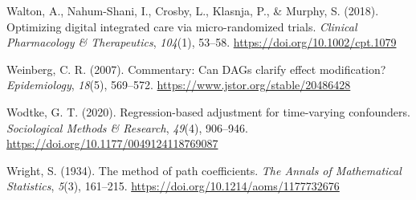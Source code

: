 \documentclass[
  11pt,
  a4paper,
]{article}
\newlength{\cslhangindent}
\newenvironment{CSLReferences}[2] %
 {\begin{list}{}{%
  \setlength{\itemindent}{0pt}
  \setlength{\leftmargin}{0pt}
  \setlength{\parsep}{0pt}
  \ifodd #1
   \setlength{\leftmargin}{\cslhangindent}
   \setlength{\itemindent}{-1\cslhangindent}
  \fi
  \setlength{\itemsep}{#2\baselineskip}}}
 {\end{list}}
\begin{document}
\begin{CSLReferences}{1}{0}
Walton, A., Nahum-Shani, I., Crosby, L., Klasnja, P., \& Murphy, S.
(2018). Optimizing digital integrated care via micro-randomized trials.
\emph{Clinical Pharmacology \& Therapeutics}, \emph{104}(1), 53--58.
\url{https://doi.org/10.1002/cpt.1079}

Weinberg, C. R. (2007). Commentary: Can DAGs clarify effect
modification? \emph{Epidemiology}, \emph{18}(5), 569--572.
\url{https://www.jstor.org/stable/20486428}

Wodtke, G. T. (2020). Regression-based adjustment for time-varying
confounders. \emph{Sociological Methods \& Research}, \emph{49}(4),
906--946. \url{https://doi.org/10.1177/0049124118769087}

Wright, S. (1934). The method of path coefficients. \emph{The Annals of
Mathematical Statistics}, \emph{5}(3), 161--215.
\url{https://doi.org/10.1214/aoms/1177732676}

\end{CSLReferences}
\end{document}
